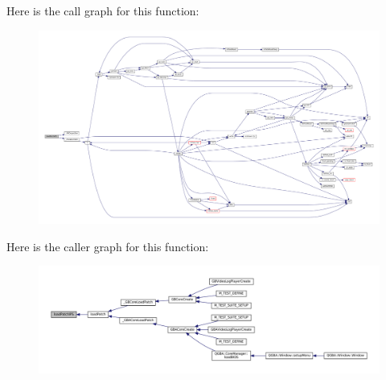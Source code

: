 Here is the call graph for this function\+:
\nopagebreak
\begin{figure}[H]
\begin{center}
\leavevmode
\includegraphics[width=350pt]{patch-ips_8c_ac86a44af7cc9232c26a9c1fbfd2cea40_cgraph}
\end{center}
\end{figure}
Here is the caller graph for this function\+:
\nopagebreak
\begin{figure}[H]
\begin{center}
\leavevmode
\includegraphics[width=350pt]{patch-ips_8c_ac86a44af7cc9232c26a9c1fbfd2cea40_icgraph}
\end{center}
\end{figure}
